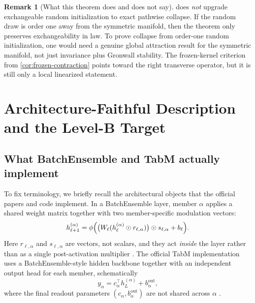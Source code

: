 \documentclass[11pt]{article}
\theoremstyle{definition}
\newtheorem{remark}[theorem]{Remark}
\begin{document}
\begin{remark}[What this theorem does and does not say]
 does \emph{not} upgrade exchangeable random initialization to exact pathwise collapse.
If the random draw is order one away from the symmetric manifold, then the theorem only preserves exchangeability in law.
To prove collapse from order-one random initialization, one would need a genuine global attraction result for the symmetric manifold,
not just invariance plus Gronwall stability.
The frozen-kernel criterion from \cref{cor:frozen-contraction} points toward the right transverse operator,
but it is still only a local linearized statement.
\end{remark}

\section{Architecture-Faithful Description and the Level-B Target}

\subsection{What BatchEnsemble and TabM actually implement}

To fix terminology, we briefly recall the architectural objects that the official papers and code implement.
In a BatchEnsemble layer, member $\alpha$ applies a shared weight matrix together with two member-specific modulation vectors:
\begin{equation}
  h_{\ell+1}^{(\alpha)}
  =
  \phi\Bigl(
    \bigl(
      W_\ell(h_\ell^{(\alpha)}\odot r_{\ell,\alpha})
    \bigr)
    \odot s_{\ell,\alpha}
    +
    b_\ell
  \Bigr).
  \label{eq:be-layer}
\end{equation}
Here $r_{\ell,\alpha}$ and $s_{\ell,\alpha}$ are vectors, not scalars,
and they act \emph{inside} the layer rather than as a single post-activation multiplier
\cite{batchensemble}.
The official TabM implementation uses a BatchEnsemble-style hidden backbone together with an independent output head for each member,
schematically
\begin{equation}
  y_\alpha
  =
  c_\alpha^\top h_L^{(\alpha)} + b_\alpha^{\mathrm{out}},
  \label{eq:tabm-arch-schematic}
\end{equation}
where the final readout parameters $(c_\alpha,b_\alpha^{\mathrm{out}})$ are not shared across $\alpha$
\cite{tabm,tabm-repo}.
\end{document}
